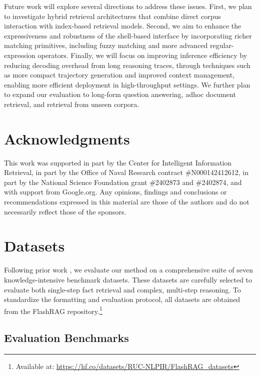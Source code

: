 \documentclass{llmxive}
\begin{document}
Future work will explore several directions to address these issues. First, we plan to investigate hybrid retrieval architectures that combine direct corpus interaction with index-based retrieval models. Second, we aim to enhance the expressiveness and robustness of the shell-based interface by incorporating richer matching primitives, including fuzzy matching and more advanced regular-expression operators. Finally, we will focus on improving inference efficiency by reducing decoding overhead from long reasoning traces, through techniques such as more compact trajectory generation and improved context management, enabling more efficient deployment in high-throughput settings. We further plan to expand our evaluation to long-form question answering, adhoc document retrieval, and retrieval from unseen corpora.

\section*{Acknowledgments}
This work was supported in part by the Center for Intelligent Information Retrieval, in part by the Office of Naval Research contract \#N000142412612, in part by the National Science Foundation grant \#2402873 and \#2402874, and with support from Google.org. Any opinions, findings and conclusions or recommendations expressed in this material are those of the authors and do not necessarily reflect those of the sponsors.





\appendix


\section{Datasets}
\label{app:dataset}


Following prior work \citep{search-r1}, we evaluate our method on a comprehensive suite of seven knowledge-intensive benchmark datasets. These datasets are carefully selected to evaluate both single-step fact retrieval and complex, multi-step reasoning. To standardize the formatting and evaluation protocol, all datasets are obtained from the FlashRAG repository.\footnote{Available at: \url{https://hf.co/datasets/RUC-NLPIR/FlashRAG_datasets}}

\subsection{Evaluation Benchmarks}
\end{document}
